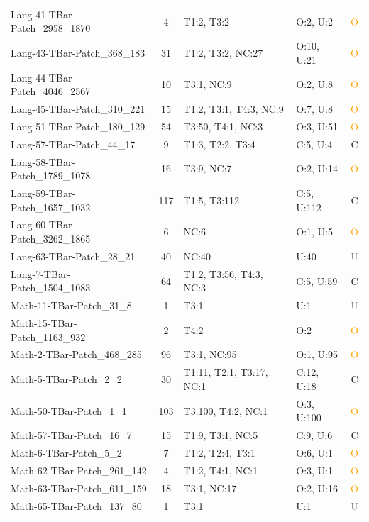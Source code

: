 \begin{longtable}{l|c|l|l|c}
Lang-41-TBar-Patch\_2958\_1870 & 4 & T1:2, T3:2 & O:2, U:2 & \textcolor{orange}{O} \\
Lang-43-TBar-Patch\_368\_183 & 31 & T1:2, T3:2, NC:27 & O:10, U:21 & \textcolor{orange}{O} \\
Lang-44-TBar-Patch\_4046\_2567 & 10 & T3:1, NC:9 & O:2, U:8 & \textcolor{orange}{O} \\
Lang-45-TBar-Patch\_310\_221 & 15 & T1:2, T3:1, T4:3, NC:9 & O:7, U:8 & \textcolor{orange}{O} \\
Lang-51-TBar-Patch\_180\_129 & 54 & T3:50, T4:1, NC:3 & O:3, U:51 & \textcolor{orange}{O} \\
Lang-57-TBar-Patch\_44\_17 & 9 & T1:3, T2:2, T3:4 & C:5, U:4 & \textcolor{green!60!black}{C} \\
Lang-58-TBar-Patch\_1789\_1078 & 16 & T3:9, NC:7 & O:2, U:14 & \textcolor{orange}{O} \\
Lang-59-TBar-Patch\_1657\_1032 & 117 & T1:5, T3:112 & C:5, U:112 & \textcolor{green!60!black}{C} \\
Lang-60-TBar-Patch\_3262\_1865 & 6 & NC:6 & O:1, U:5 & \textcolor{orange}{O} \\
Lang-63-TBar-Patch\_28\_21 & 40 & NC:40 & U:40 & \textcolor{gray}{U} \\
Lang-7-TBar-Patch\_1504\_1083 & 64 & T1:2, T3:56, T4:3, NC:3 & C:5, U:59 & \textcolor{green!60!black}{C} \\
Math-11-TBar-Patch\_31\_8 & 1 & T3:1 & U:1 & \textcolor{gray}{U} \\
Math-15-TBar-Patch\_1163\_932 & 2 & T4:2 & O:2 & \textcolor{orange}{O} \\
Math-2-TBar-Patch\_468\_285 & 96 & T3:1, NC:95 & O:1, U:95 & \textcolor{orange}{O} \\
Math-5-TBar-Patch\_2\_2 & 30 & T1:11, T2:1, T3:17, NC:1 & C:12, U:18 & \textcolor{green!60!black}{C} \\
Math-50-TBar-Patch\_1\_1 & 103 & T3:100, T4:2, NC:1 & O:3, U:100 & \textcolor{orange}{O} \\
Math-57-TBar-Patch\_16\_7 & 15 & T1:9, T3:1, NC:5 & C:9, U:6 & \textcolor{green!60!black}{C} \\
Math-6-TBar-Patch\_5\_2 & 7 & T1:2, T2:4, T3:1 & O:6, U:1 & \textcolor{orange}{O} \\
Math-62-TBar-Patch\_261\_142 & 4 & T1:2, T4:1, NC:1 & O:3, U:1 & \textcolor{orange}{O} \\
Math-63-TBar-Patch\_611\_159 & 18 & T3:1, NC:17 & O:2, U:16 & \textcolor{orange}{O} \\
Math-65-TBar-Patch\_137\_80 & 1 & T3:1 & U:1 & \textcolor{gray}{U} \\

\end{longtable}
